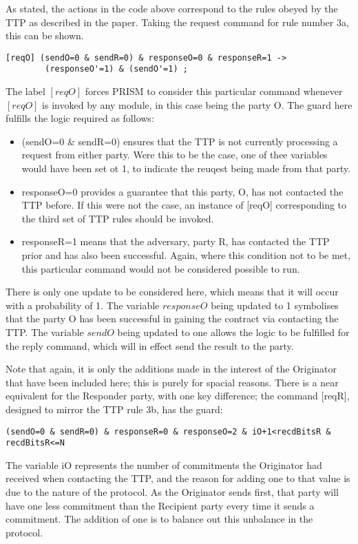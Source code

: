 \documentclass{l4proj}
\begin{document}
As stated, the actions in the code above correspond to the rules obeyed by the TTP as described in the paper. Taking the request command for rule number 3a, this can be shown.
\begin{lstlisting}
[reqO] (sendO=0 & sendR=0) & responseO=0 & responseR=1 -> 
        (responseO'=1) & (sendO'=1) ;
\end{lstlisting}
The label $[reqO]$ forces PRISM to consider this particular command whenever $[reqO]$ is invoked by any module, in this case being the party O. The guard here fulfills the logic required as follows:
\begin{itemize}
\item (sendO=0 \& sendR=0) ensures that the TTP is not currently processing a request from either party. Were this to be the case, one of thee variables would have been set ot 1, to indicate the reuqest being made from that party.
\item responseO=0 provides a guarantee that this party, O, has not contacted the TTP before. If this were not the case, an instance of [reqO] corresponding to the third set of TTP rules should be invoked.
\item responseR=1 means that the adversary, party R, has contacted the TTP prior and has also been successful. Again, where this condition not to be met, this particular command would not be considered possible to run.
\end{itemize}
There is only one update to be considered here, which means that it will occur with a probability of 1. The variable $responseO$ being updated to 1 symbolises that the party O has been successful in gaining the contract via contacting the TTP. The variable $sendO$ being updated to one allows the logic to be fulfilled for the reply command, which will in effect send the result to the party. 


 Note that again, it is only the additions made in the interest of the Originator that have been included here; this is purely for spacial reasons. There is a near equivalent for the Responder party, with one key difference; the command [reqR], designed to mirror the TTP rule 3b, has the guard:
\begin{lstlisting}
(sendO=0 & sendR=0) & responseR=0 & responseO=2 & iO+1<recdBitsR & recdBitsR<=N
\end{lstlisting}
The variable iO represents the number of commitments the Originator had received when contacting the TTP, and the reason for adding one to that value is due to the nature of the protocol. As the Originator sends first, that party will have one less commitment than the Recipient party every time it sends a commitment. The addition of one is to balance out this unbalance in the protocol. 
\end{document}
